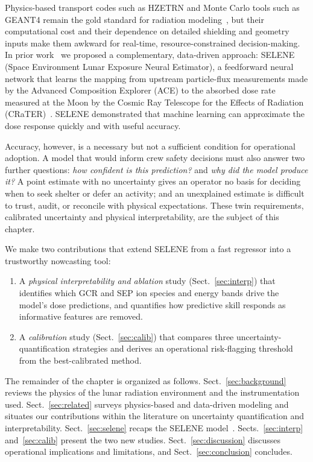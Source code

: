 \documentclass[graybox]{SNmult}
\begin{document}
Physics-based transport codes such as HZETRN and Monte Carlo tools such as
GEANT4 remain the gold standard for radiation
modeling~\cite{Slaba2013,Singleterry2010,2022cosp...44.2697D}, but their computational cost and their
dependence on detailed shielding and geometry inputs make them awkward for
real-time, resource-constrained decision-making. In prior
work~\cite{tummala2025selene} we proposed a complementary, data-driven approach:
SELENE (Space Environment Lunar Exposure Neural Estimator), a feedforward neural
network that learns the mapping from upstream particle-flux measurements made by
the Advanced Composition Explorer (ACE) to the absorbed dose rate measured at
the Moon by the Cosmic Ray Telescope for the Effects of Radiation
(CRaTER)~\cite{Spence2010,Looper2020}. SELENE demonstrated that machine learning
can approximate the dose response quickly and with useful accuracy.

Accuracy, however, is a necessary but not a sufficient condition for
operational adoption. A model that would inform crew safety decisions must also
answer two further questions: \emph{how confident is this prediction?} and
\emph{why did the model produce it?} A point estimate with no uncertainty gives
an operator no basis for deciding when to seek shelter or defer an activity; and
an unexplained estimate is difficult to trust, audit, or reconcile with physical
expectations. These twin requirements, calibrated uncertainty and physical
interpretability, are the subject of this chapter.

We make two contributions that extend SELENE from a fast regressor into a
trustworthy nowcasting tool:
\begin{enumerate}
  \item A \emph{physical interpretability and ablation} study
        (Sect.~\ref{sec:interp}) that identifies which GCR and SEP ion species
        and energy bands drive the model's dose predictions, and quantifies how
        predictive skill responds as informative features are removed.
  \item A \emph{calibration} study (Sect.~\ref{sec:calib}) that compares three
        uncertainty-quantification strategies and derives an operational
        risk-flagging threshold from the best-calibrated method.
\end{enumerate}

The remainder of the chapter is organized as follows.
Sect.~\ref{sec:background} reviews the physics of the lunar radiation
environment and the instrumentation used. Sect.~\ref{sec:related} surveys
physics-based and data-driven modeling and situates our contributions within the
literature on uncertainty quantification and interpretability.
Sect.~\ref{sec:selene} recaps the SELENE model~\cite{tummala2025selene}.
Sects.~\ref{sec:interp} and~\ref{sec:calib} present the two new studies.
Sect.~\ref{sec:discussion} discusses operational implications and limitations,
and Sect.~\ref{sec:conclusion} concludes.
\end{document}
